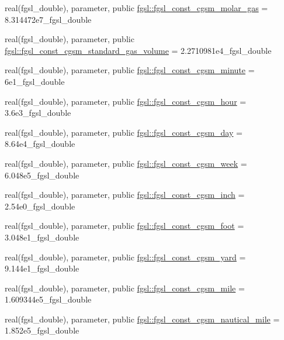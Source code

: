 \begin{DoxyCompactItemize}
\item 
real(fgsl\+\_\+double), parameter, public \hyperlink{namespacefgsl_a23addc2e9852914913cdbe8e164b27ae}{fgsl\+::fgsl\+\_\+const\+\_\+cgsm\+\_\+molar\+\_\+gas} = 8.\+314472e7\+\_\+fgsl\+\_\+double
\item 
real(fgsl\+\_\+double), parameter, public \hyperlink{namespacefgsl_ab7cd57aadb050c6aa836b7ab1246f435}{fgsl\+::fgsl\+\_\+const\+\_\+cgsm\+\_\+standard\+\_\+gas\+\_\+volume} = 2.\+2710981e4\+\_\+fgsl\+\_\+double
\item 
real(fgsl\+\_\+double), parameter, public \hyperlink{namespacefgsl_ab028fa17e53d65adbb35fa580f5e25a0}{fgsl\+::fgsl\+\_\+const\+\_\+cgsm\+\_\+minute} = 6e1\+\_\+fgsl\+\_\+double
\item 
real(fgsl\+\_\+double), parameter, public \hyperlink{namespacefgsl_ae4bb30ae02c03177a710c656125616a7}{fgsl\+::fgsl\+\_\+const\+\_\+cgsm\+\_\+hour} = 3.\+6e3\+\_\+fgsl\+\_\+double
\item 
real(fgsl\+\_\+double), parameter, public \hyperlink{namespacefgsl_af34712504add6a207ec8e068ff61d8cd}{fgsl\+::fgsl\+\_\+const\+\_\+cgsm\+\_\+day} = 8.\+64e4\+\_\+fgsl\+\_\+double
\item 
real(fgsl\+\_\+double), parameter, public \hyperlink{namespacefgsl_ab1a6fad27f87e45e6de1d5b58d7b86fc}{fgsl\+::fgsl\+\_\+const\+\_\+cgsm\+\_\+week} = 6.\+048e5\+\_\+fgsl\+\_\+double
\item 
real(fgsl\+\_\+double), parameter, public \hyperlink{namespacefgsl_ad425eda5fab2505e2342ed4f46b5f5f0}{fgsl\+::fgsl\+\_\+const\+\_\+cgsm\+\_\+inch} = 2.\+54e0\+\_\+fgsl\+\_\+double
\item 
real(fgsl\+\_\+double), parameter, public \hyperlink{namespacefgsl_a479fa8c0e8ae3d17e949a4a365a39c19}{fgsl\+::fgsl\+\_\+const\+\_\+cgsm\+\_\+foot} = 3.\+048e1\+\_\+fgsl\+\_\+double
\item 
real(fgsl\+\_\+double), parameter, public \hyperlink{namespacefgsl_a3f40255d359411c5789f360fd7c2961e}{fgsl\+::fgsl\+\_\+const\+\_\+cgsm\+\_\+yard} = 9.\+144e1\+\_\+fgsl\+\_\+double
\item 
real(fgsl\+\_\+double), parameter, public \hyperlink{namespacefgsl_a56582420eb5e22fb229cf4eea9cb3fca}{fgsl\+::fgsl\+\_\+const\+\_\+cgsm\+\_\+mile} = 1.\+609344e5\+\_\+fgsl\+\_\+double
\item 
real(fgsl\+\_\+double), parameter, public \hyperlink{namespacefgsl_ad2fef81cdb19dcaed2ce527744cb8600}{fgsl\+::fgsl\+\_\+const\+\_\+cgsm\+\_\+nautical\+\_\+mile} = 1.\+852e5\+\_\+fgsl\+\_\+double
\item 

\end{DoxyCompactItemize}
